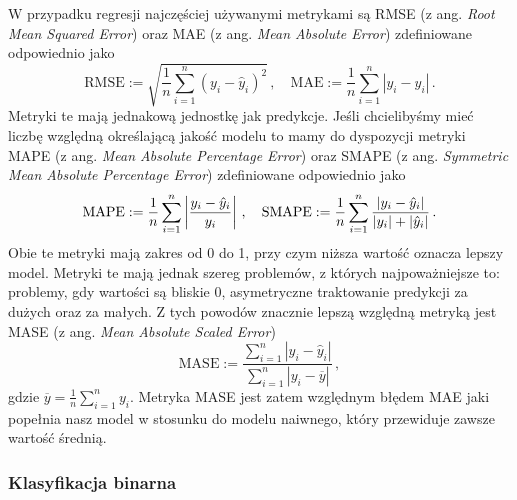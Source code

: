 \documentclass{myclass}
\numberwithin{equation}{subsection}
\begin{document}
W przypadku regresji najczęściej używanymi metrykami są RMSE (z ang. \textit{Root Mean Squared
Error}) oraz MAE (z ang. \textit{Mean Absolute Error}) zdefiniowane odpowiednio jako
\begin{equation}
    \mathrm{RMSE} := \sqrt{\frac{1}{n}\sum_{i=1}^n (y_i - \hat{y}_i)^2}\,,\quad\mathrm{MAE} := \frac{1}{n}\sum_{i=1}^n|y_i - \hat{y}_i|\,.
\end{equation}
Metryki te mają jednakową jednostkę jak predykcje. Jeśli chcielibyśmy mieć liczbę względną
określającą jakość modelu to mamy do dyspozycji metryki MAPE (z ang. \textit{Mean Absolute
Percentage Error}) oraz SMAPE (z ang. \textit{Symmetric Mean Absolute Percentage Error})
zdefiniowane odpowiednio jako
\begin{equation}
    \mathrm{MAPE} := \frac{1}{n}\sum_{i=1}^n\left|\frac{y_i - \hat{y}_i}{y_i}\right|\,,\quad\mathrm{SMAPE} := \frac{1}{n}\sum_{i=1}^n \frac{|y_i - \hat{y}_i|}{|y_i| + |\hat{y}_i|}\,.\\
\end{equation}
Obie te metryki mają zakres od 0 do 1, przy czym niższa wartość oznacza lepszy model. Metryki te
mają jednak szereg problemów, z których najpoważniejsze to: problemy, gdy wartości są bliskie 0,
asymetryczne traktowanie predykcji za dużych oraz za małych. Z tych powodów znacznie lepszą względną
metryką jest MASE (z ang. \textit{Mean Absolute Scaled Error})
\begin{equation}
    \mathrm{MASE} := \frac{\sum_{i=1}^n |y_i - \hat{y}_i|}{\sum_{i=1}^n |y_i - \overline{y}|}\,,
\end{equation}
gdzie \(\overline{y} = \frac{1}{n}\sum_{i=1}^n y_i\). Metryka MASE jest zatem względnym błędem MAE
jaki popełnia nasz model w stosunku do modelu naiwnego, który przewiduje zawsze wartość średnią.


\subsubsection{Klasyfikacja binarna}
\end{document}
